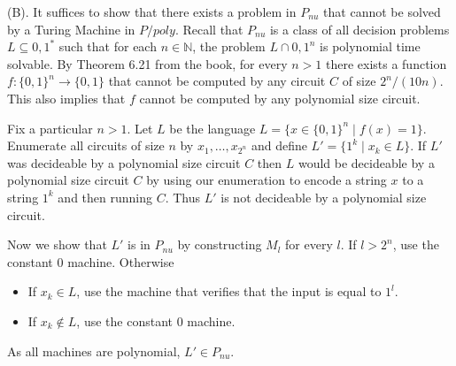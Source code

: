 \begin{question}
    \begin{answer} (B).
        It suffices to show that there exists a problem in $P_{nu}$ that cannot 
        be solved by a Turing Machine in $P/poly$. Recall that $P_{nu}$ is a 
        class of all decision problems $L \subseteq {0, 1}^*$ such that for
         each $n \in \mathbb{N}$, the problem $L \cap {0, 1}^n$ is polynomial
          time solvable. By Theorem 6.21 from the book, for every $n > 1$ there 
          exists a function $f:\{0,1\}^n\to\{0,1\}$ that cannot be computed by any 
          circuit $C$ of size 
          $2^n/(10n)$. This also implies that $f$ cannot be computed by any
            polynomial size circuit.
          \par Fix a particular $n > 1$. Let $L$ be the language
          $L=\{x\in\{0,1\}^n \mid f(x)=1\}$. Enumerate all circuits of size
          $n$ by $x_1,\dots,x_{2^n}$
          and define $L'=\{1^k \mid x_k\in L\}$.
          If $L'$ was decideable by a polynomial size circuit $C$ then
          $L$ would be decideable by a polynomial size circuit $C$
          by using our enumeration to encode a string $x$
          to a string $1^k$ and then running $C$.
          Thus $L'$ is not decideable by a polynomial size circuit.
            \par Now we show that $L'$ is in $P_{nu}$ by constructing $M_l$
            for every $l$.
            If $l>2^n$, use the constant $0$ machine.
            Otherwise
            \begin{itemize}
                \item If $x_k\in L$, use the machine that
                verifies that the input is equal to $1^l$.
                \item If $x_k\notin L$, use the constant $0$ machine.
            \end{itemize}
            As all machines are polynomial, $L'\in P_{nu}$.
    \end{answer}
    
\end{question}
